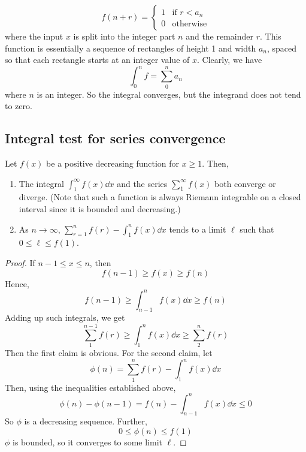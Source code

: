 \begin{enumerate}[(1)]
	      \[
		      f(n + r) = \begin{cases}
			      1 & \text{if } r < a_n \\
			      0 & \text{otherwise}
		      \end{cases}
	      \]
	      where the input \(x\) is split into the integer part \(n\) and the remainder \(r\).
	      This function is essentially a sequence of rectangles of height 1 and width \(a_n\), spaced so that each rectangle starts at an integer value of \(x\).
	      Clearly, we have
	      \[
		      \int_0^n f = \sum_0^n a_n
	      \]
	      where \(n\) is an integer.
	      So the integral converges, but the integrand does not tend to zero.
\end{enumerate}

\subsection{Integral test for series convergence}
\begin{theorem}
	Let \(f(x)\) be a positive decreasing function for \(x \geq 1\).
	Then,
	\begin{enumerate}[(1)]
		\item The integral \(\int_1^\infty f(x) \dd{x}\) and the series \(\sum_1^\infty f(x)\) both converge or diverge.
		      (Note that such a function is always Riemann integrable on a closed interval since it is bounded and decreasing.)
		\item As \(n \to \infty\), \(\sum_{r=1}^n f(r) - \int_1^n f(x) \dd{x}\) tends to a limit \(\ell\) such that \(0 \leq \ell \leq f(1)\).
	\end{enumerate}
\end{theorem}
\begin{proof}
	If \(n-1 \leq x \leq n\), then
	\[
		f(n-1) \geq f(x) \geq f(n)
	\]
	Hence,
	\[
		f(n-1) \geq \int_{n-1}^n f(x) \dd{x} \geq f(n)
	\]
	Adding up such integrals, we get
	\[
		\sum_1^{n-1} f(r) \geq \int_1^n f(x) \dd{x} \geq \sum_2^{n} f(r)
	\]
	Then the first claim is obvious.
	For the second claim, let
	\[
		\phi(n) = \sum_1^n f(r) - \int_1^n f(x) \dd{x}
	\]
	Then, using the inequalities established above,
	\[
		\phi(n) - \phi(n-1) = f(n) - \int_{n-1}^n f(x) \dd{x} \leq 0
	\]
	So \(\phi\) is a decreasing sequence.
	Further,
	\[
		0 \leq \phi(n) \leq f(1)
	\]
	\(\phi\) is bounded, so it converges to some limit \(\ell\).
\end{proof}


